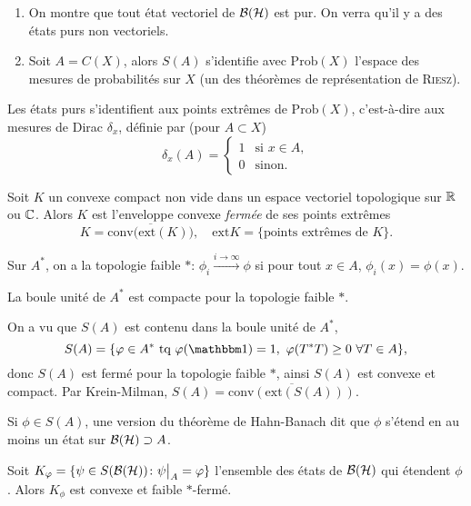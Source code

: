 \begin{exs}
  \begin{enumerate}
  \item On montre que tout état vectoriel de $\mathcal{B}(\mathcal{H})$ est pur. On verra qu'il y a des états purs non vectoriels.
  \item Soit $A = C(X)$, alors $S(A)$ s'identifie avec $\mathrm{Prob}(X)$ l'espace des mesures de probabilités
    sur $X$ (un des théorèmes de représentation de \textsc{Riesz}). \qedhere
  \end{enumerate}
\end{exs}

Les états purs s'identifient aux points extrêmes de $\mathrm{Prob}(X)$, c'est-à-dire aux mesures de Dirac
$\delta_x$, définie par (pour $A \subset X$)
\[ \delta_x(A) =
  \begin{cases}
    1 & \text{si } x \in A,\\
    0 & \text{sinon.}
  \end{cases}
\]


\begin{theo}
  Soit $K$ un convexe compact non vide dans un espace vectoriel topologique sur $\mathbb{R}$ ou $\mathbb{C}$. Alors $K$ est
  l'enveloppe convexe \emph{fermée} de ses points extrêmes 
  \[ K = \overline{\mathrm{conv(ext}(K))},\quad \mathrm{ext}K = \{\text{points extrêmes de } K\}. \]
\end{theo}

Sur $A^\ast$, on a la topologie faible $\ast$: $\phi_i \xrightarrow{i \to \infty} \phi$ si pour tout $x \in
A$, $\phi_i(x) = \phi(x)$.

\begin{theo}
  La boule unité de $A^\ast$ est compacte pour la topologie faible $\ast$.
\end{theo}

On a vu que $S(A)$ est contenu dans la boule unité de $A^\ast$, 
\[ S(A) = \{\phi \in A^\ast \text{ tq } \phi(\un) = 1,\ \phi(T^\ast T) \geq 0\ \forall T \in A\}, \]
donc $S(A)$ est fermé pour la topologie faible $\ast$, ainsi $S(A)$ est convexe et compact. Par Krein-Milman,
$S(A) = \overline{\mathrm{conv}(\mathrm{ext}(S(A)))}$.

Si $\phi \in S(A)$, une version du théorème de Hahn-Banach dit que $\phi$ s'étend en au moins un état sur $\mathcal{B}(\mathcal{H})
\supset A$.

Soit $K_\varphi = \{\psi \in S(\mathcal{B}(\mathcal{H})) \colon \psi \big|_{A} = \varphi\}$ l'ensemble des états de $\mathcal{B}(\mathcal{H})$ qui étendent
$\phi$. Alors $K_\phi$ est convexe et faible $\ast$-fermé.


